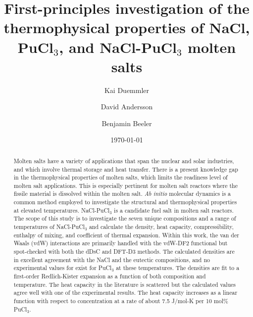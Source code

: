 \documentclass[review]{elsarticle}
\begin{document}
\begin{frontmatter}

\title{First-principles investigation of the thermophysical properties of NaCl, PuCl$_3$, and NaCl-PuCl$_3$ molten salts}

\author[ncsu]{Kai Duemmler}
\author[lanl]{David Andersson}
\author[ncsu,inl]{Benjamin Beeler}

\address[ncsu]{Department of Nuclear Engineering, North Carolina State University, Raleigh, NC 27695}
\address[inl]{Idaho National Laboratory, Idaho Falls, ID 83415}
\address[lanl]{Materials Science and Technology Division, Los Alamos National Laboratory, P.O. Box 1663. Los Alamos, NM, 87545, USA}
\date{\today}

\begin{abstract}
Molten salts have a variety of applications that span the nuclear and solar industries, and which involve thermal storage and heat transfer. There is a present knowledge gap in the thermophysical properties of molten salts, which limits the readiness level of molten salt applications. This is especially pertinent for molten salt reactors where the fissile material is dissolved within the molten salt. \textit{Ab initio} molecular dynamics is a common method employed to investigate the structural and thermophysical properties at elevated temperatures. NaCl-PuCl$_3$ is a candidate fuel salt in molten salt reactors. The scope of this study is to investigate the seven unique compositions and a range of temperatures of NaCl-PuCl$_3$ and calculate the density, heat capacity, compressibility, enthalpy of mixing, and coefficient of thermal expansion. Within this work, the van der Waals (vdW) interactions are primarily handled with the vdW-DF2 functional but spot-checked with both the dDsC and DFT-D3 methods. The calculated densities are in excellent agreement with the NaCl and the eutectic compositions, and no experimental values for exist for PuCl$_3$ at these temperatures. The densities are fit to a first-order Redlich-Kister expansion as a function of both composition and temperature. The heat capacity in the literature is scattered but the calculated values agree well with one of the experimental results. The heat capacity increases as a linear function with respect to concentration at a rate of about 7.5 J/mol-K per 10 mol\% PuCl$_3$.
\end{abstract}

\end{frontmatter}
\end{document}
